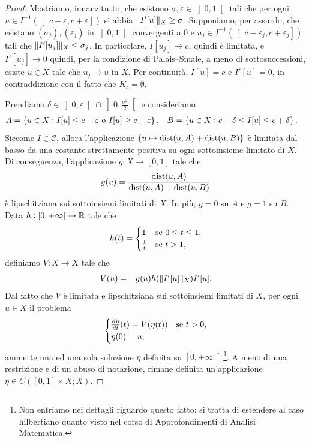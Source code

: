 \begin{proof}
	Mostriamo, innanzitutto, che esistono $\sigma, \varepsilon \in \left] 0,1\right[ $ tali che per ogni $u \in I^{-1}(\left] c-\varepsilon,c+\varepsilon\right] )$ si abbia $\lVert I'[u]\rVert_X \ge \sigma$. Supponiamo, per assurdo, che esistano $(\sigma_j),(\varepsilon_j)$ in $\left] 0,1\right[ $ convergenti a $0$ e $u_j \in I^{-1}(\left] c-\varepsilon_j,c+\varepsilon_j\right] )$ tali che $\lVert I'[u_j]\rVert_X \le \sigma_j$. In particolare, $I[u_j] \to c$, quindi è limitata, e $I'[u_j]\to 0$ quindi, per la condizione di Palais--Smale, a meno di sottosuccessioni, esiste $u \in X$ tale che $u_j \to u$ in $X$. Per continuità, $I[u] = c$ e $I'[u]=0$, in contraddizione con il fatto che $K_c = \emptyset$.
	
	Prendiamo $\delta \in \left] 0,\varepsilon\right[ \cap \left] 0,\frac{\sigma^2}{2}\right[$ e consideriamo 
	\begin{align*}
		A &= \left\lbrace u \in X : I[u]\le c-\varepsilon \textup{ o } I[u]\ge c+\varepsilon\right\rbrace, & B&=\left\lbrace u \in X: c-\delta \le I[u]\le c+\delta \right\rbrace.
	\end{align*}
	Siccome $I \in \mathcal{C}$, allora l'applicazione $\left\lbrace u \mapsto \textup{dist}(u,A) + \textup{dist}(u,B)\right\rbrace $ è limitata dal basso da una costante strettamente positiva su ogni sottoinsieme limitato di $X$. Di conseguenza, l'applicazione $g: X \to [0,1]$ tale che
	\[ g(u) = \frac{\textup{dist}(u,A)}{\textup{dist}(u,A) + \textup{dist}(u,B)} \]
	è lipschitziana sui sottoinsiemi limitati di $X$. In più, $g=0$ su $A$ e $g=1$ su $B$. Data $h: \left[ 0,+\infty\right[  \to \mathbb{R}$ tale che
	\[ h(t) = \begin{cases}
		1 & \textup{se }0\le t \le 1,\\
		\frac{1}{t} & \textup{se } t >1,
	\end{cases} \]
	definiamo $V: X \to X$ tale che
	\[ V(u) = -g(u)h(\lVert I'[u]\rVert_X)I'[u]. \]
	Dal fatto che $V$ è limitata e lipschitziana sui sottoinsiemi limitati di $X$, per ogni $u \in X$ il problema 
	\[ \begin{cases}
		\frac{d\eta}{dt}(t) = V(\eta(t)) & \textup{se } t>0,\\
		\eta(0) = u,
	\end{cases} \]
	ammette una ed una sola soluzione $\eta$ definita su $\left[0,+\infty\right[ $\footnote{Non entriamo nei dettagli riguardo questo fatto: si tratta di estendere al caso hilbertiano quanto visto nel corso di Approfondimenti di Analisi Matematica.}. A meno di una restrizione e di un abuso di notazione, rimane definita un'applicazione $\eta \in C([0,1]\times X; X)$.

\end{proof}
